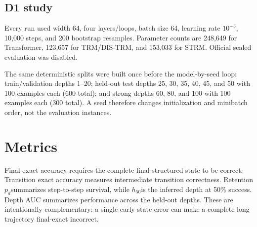 \documentclass[11pt]{article}
\newcommand{\pd}{\ensuremath{p_d}}
\newcommand{\hfive}{\ensuremath{h_{50}}}
\begin{document}
\subsection{D1 study}
Every run used width 64, four layers/loops, batch size 64, learning rate
$10^{-3}$, 10,000 steps, and 200 bootstrap resamples. Parameter counts are
248,649 for Transformer, 123,657 for TRM/DIS-TRM, and 153,033 for STRM.
Official sealed evaluation was disabled.

The same deterministic splits were built once before the model-by-seed loop:
train/validation depths 1--20; held-out test depths 25, 30, 35, 40, 45, and
50 with 100 examples each (600 total); and strong depths 60, 80, and 100 with
100 examples each (300 total). A seed therefore changes initialization and
minibatch order, not the evaluation instances.

\section{Metrics}
Final exact accuracy requires the complete final structured state to be
correct. Transition exact accuracy measures intermediate transition correctness.
Retention \pd summarizes step-to-step survival, while \hfive is the inferred
depth at 50\% success. Depth AUC summarizes performance across the held-out
depths. These are intentionally complementary: a single early state error can
make a complete long trajectory final-exact incorrect.
\end{document}
